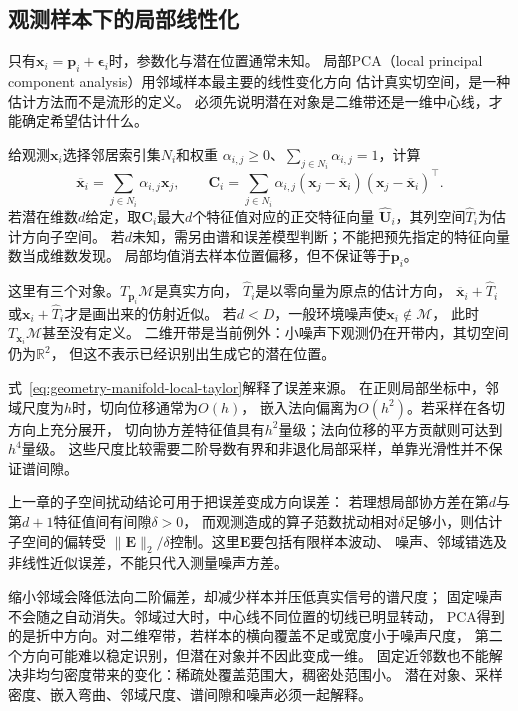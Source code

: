 \subsection{观测样本下的局部线性化}
\label{sec:geometry-sampled-local-linearization}

只有$\bm x_i=\bm p_i+\bm\epsilon_i$时，参数化与潜在位置通常未知。
局部PCA（local principal component analysis）用邻域样本最主要的线性变化方向
估计真实切空间，是一种估计方法而不是流形的定义。
必须先说明潜在对象是二维带还是一维中心线，才能确定希望估计什么。

给观测$\bm x_i$选择邻居索引集$N_i$和权重
$\alpha_{i,j}\geq0$、$\sum_{j\in N_i}\alpha_{i,j}=1$，计算
\begin{equation}
 \overline{\bm x}_i=\sum_{j\in N_i}\alpha_{i,j}\bm x_j,\qquad
 \bm C_i=\sum_{j\in N_i}\alpha_{i,j}
  (\bm x_j-\overline{\bm x}_i)(\bm x_j-\overline{\bm x}_i)^\top.
 \label{eq:geometry-local-weighted-covariance}
\end{equation}
若潜在维数$d$给定，取$\bm C_i$最大$d$个特征值对应的正交特征向量
$\widehat{\bm U}_i$，其列空间$\widehat T_i$为估计方向子空间。
若$d$未知，需另由谱和误差模型判断；不能把预先指定的特征向量数当成维数发现。
局部均值消去样本位置偏移，但不保证等于$\bm p_i$。

这里有三个对象。$T_{\bm p_i}\mathcal M$是真实方向，
$\widehat T_i$是以零向量为原点的估计方向，
$\overline{\bm x}_i+\widehat T_i$或$\bm x_i+\widehat T_i$才是画出来的仿射近似。
若$d<D$，一般环境噪声使$\bm x_i\notin\mathcal M$，
此时$T_{\bm x_i}\mathcal M$甚至没有定义。
二维开带是当前例外：小噪声下观测仍在开带内，其切空间仍为$\mathbb R^2$，
但这不表示已经识别出生成它的潜在位置。

式~\eqref{eq:geometry-manifold-local-taylor}解释了误差来源。
在正则局部坐标中，邻域尺度为$h$时，切向位移通常为$O(h)$，
嵌入法向偏离为$O(h^2)$。若采样在各切方向上充分展开，
切向协方差特征值具有$h^2$量级；法向位移的平方贡献则可达到$h^4$量级。
这些尺度比较需要二阶导数有界和非退化局部采样，单靠光滑性并不保证谱间隙。

上一章的子空间扰动结论可用于把误差变成方向误差：
若理想局部协方差在第$d$与第$d+1$特征值间有间隙$\delta>0$，
而观测造成的算子范数扰动相对$\delta$足够小，则估计子空间的偏转受
$\lVert\bm E\rVert_2/\delta$控制。这里$\bm E$要包括有限样本波动、
噪声、邻域错选及非线性近似误差，不能只代入测量噪声方差。

缩小邻域会降低法向二阶偏差，却减少样本并压低真实信号的谱尺度；
固定噪声不会随之自动消失。邻域过大时，中心线不同位置的切线已明显转动，
PCA得到的是折中方向。对二维窄带，若样本的横向覆盖不足或宽度小于噪声尺度，
第二个方向可能难以稳定识别，但潜在对象并不因此变成一维。
固定近邻数也不能解决非均匀密度带来的变化：稀疏处覆盖范围大，稠密处范围小。
潜在对象、采样密度、嵌入弯曲、邻域尺度、谱间隙和噪声必须一起解释。


